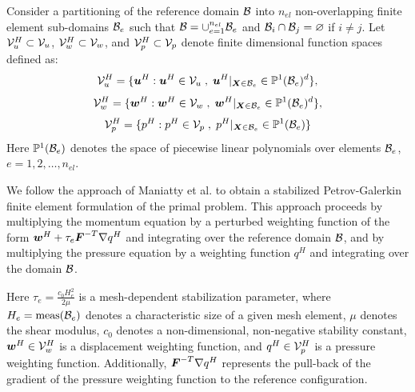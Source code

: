 Consider a partitioning of the reference domain $\mathcal{B}$ into $n_{el}$
non-overlapping finite element sub-domains $\mathcal{B}_e$ such that $\mathcal{B} =
\cup_{e=1}^{n_{el}} \mathcal{B}_e$ and $\mathcal{B}_i \cap \mathcal{B}_j = \varnothing$ if $i \neq j$.
Let $\mathcal{V}^H_u \subset \mathcal{V}_u$, $\mathcal{V}^H_w \subset \mathcal{V}_w$, and $\mathcal{V}^H_p \subset \mathcal{V}_p$
denote finite dimensional function spaces defined as:
%
\begin{gather}
\mathcal{V}^H_u = \{ \boldsymbol{u}^H : \boldsymbol{u}^H \in \mathcal{V}_u \; , \;
\boldsymbol{u}^H |_{\boldsymbol{X} \in \mathcal{B}_e} \in \mathbb{P}^1 (\mathcal{B}_e)^d \},
\label{eq:mech_disp_space}
\end{gather}
%
\begin{gather}
\mathcal{V}^H_w = \{ \boldsymbol{w}^H : \boldsymbol{w}^H \in \mathcal{V}_w \; , \;
\boldsymbol{w}^H |_{\boldsymbol{X} \in \mathcal{B}_e} \in \mathbb{P}^1 (\mathcal{B}_e)^d \},
\label{eq:mech_weight_space}
\end{gather}
%
\begin{gather}
\mathcal{V}^H_p = \{ p^H : p^H \in \mathcal{V}_p \; , \;
p^H |_{\boldsymbol{X} \in \mathcal{B}_e} \in \mathbb{P}^1 (\mathcal{B}_e) \}
\label{eq:mech_press_space}
\end{gather}
%
Here $\mathbb{P}^1(\mathcal{B}_e)$ denotes the space of piecewise linear polynomials
over elements $\mathcal{B}_e$, $e=1,2,\dots,n_{el}$.

We follow the approach of Maniatty et al. \cite{klaas1999stabilized,
maniatty2002higher, ramesh2005stabilized} to obtain a stabilized
Petrov-Galerkin finite element formulation of the primal problem.
This approach proceeds by multiplying the momentum equation by a perturbed
weighting function of the form $\boldsymbol{w}^H + \tau_e \boldsymbol{F}^{-T} \nabla q^H$
and integrating over the reference domain $\mathcal{B}$, and by multiplying the
pressure equation by a weighting function $q^H$ and integrating over the
domain $\mathcal{B}$.

Here $\tau_e = \frac{c_0 H_e^2}{2 \mu}$ is a mesh-dependent stabilization
parameter, where $H_e = \text{meas}(\mathcal{B}_e)$ denotes a characteristic size
of a given mesh element, $\mu$ denotes the shear modulus, $c_0$ denotes a
non-dimensional, non-negative stability constant, $\boldsymbol{w}^H \in \mathcal{V}^H_w$ is
a displacement weighting function, and $q^H \in \mathcal{V}^H_p$ is a
pressure weighting function. Additionally, $\boldsymbol{F}^{-T} \nabla q^H$
represents the pull-back of the gradient of the pressure weighting function
to the reference configuration.

